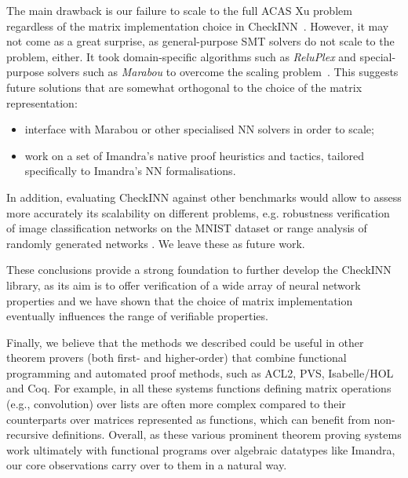 \documentclass[runningheads]{llncs}
\begin{document}
The main drawback is our failure to scale to the full ACAS Xu problem regardless of the matrix implementation choice in CheckINN~\cite{DPKD22}. However, it may not come as a great surprise, as general-purpose SMT solvers do not scale to the problem, either.  It took  domain-specific algorithms such as \emph{ReluPlex} and special-purpose solvers such as \emph{Marabou}  to overcome the scaling problem~\cite{KaBaDiJuKo17Reluplex,KatzHIJLLSTWZDK19}.
This suggests future solutions that are somewhat orthogonal to the choice of the matrix representation:
\begin{itemize}
  \item interface with Marabou or other specialised NN solvers in order to scale;
\item work on a set of Imandra's native proof heuristics and tactics, tailored specifically to Imandra's NN formalisations.
\end{itemize}

In addition, evaluating CheckINN against other benchmarks would allow to assess more accurately its scalability on different problems, e.g. robustness verification of image classification networks on the MNIST dataset \cite{noauthor_vnn_nodate} or range analysis of randomly generated networks \cite{dutta_output_2018}. We leave these as future work. 

These conclusions provide a strong foundation to further develop the CheckINN library, as its aim is to offer verification of a wide array of neural network properties and we have shown that the choice of matrix implementation eventually influences the range of verifiable properties. 

Finally, we believe that the methods we described could be useful in other theorem provers (both first- and higher-order) that combine functional programming and automated proof methods, such as ACL2, PVS, Isabelle/HOL and Coq. 
For example, in all these systems functions defining matrix operations (e.g., convolution) over lists  are often more complex compared to their counterparts over matrices represented as functions, which can benefit from non-recursive definitions.
Overall, as these various prominent theorem proving systems work ultimately with functional programs over algebraic datatypes like Imandra, our core observations carry over to them in a natural way.

%
%


\end{document}
